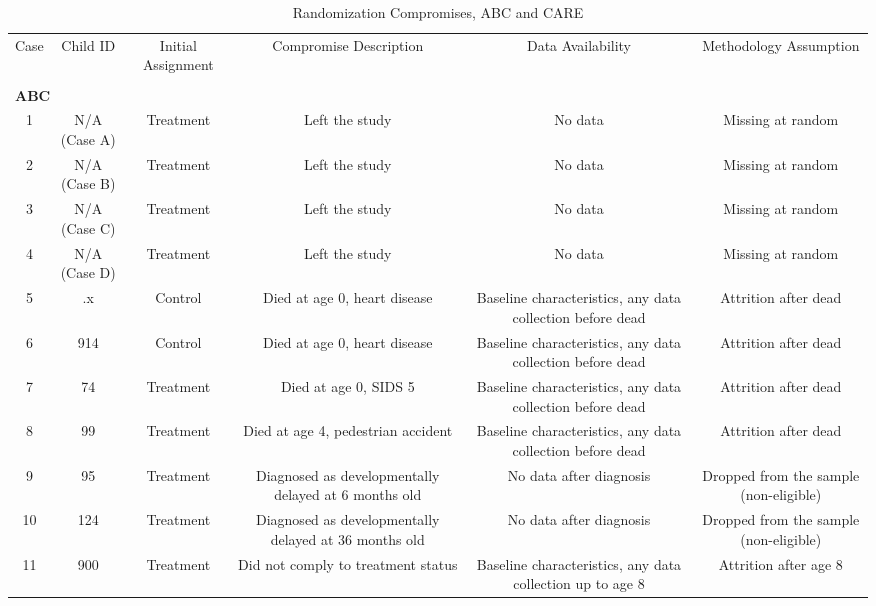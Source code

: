 

% 




\begin{sidewaystable}[H] 
\begin{threeparttable}
\caption{Randomization Compromises, ABC and CARE}
\label{table:yourlabel}
\centering
\tiny
\begin{tabular}{cccccc} \hline \hline
Case & Child ID & Initial Assignment & Compromise Description & Data Availability & Methodology Assumption \\ \\ \hline
\multicolumn{6}{l}{\textbf{ABC}} \\ 
1 & N/A (Case A) & Treatment & Left the study & No data & Missing at random \\
2 & N/A (Case B) & Treatment & Left the study & No data & Missing at random \\
3 & N/A (Case C) & Treatment & Left the study & No data & Missing at random \\
4 & N/A (Case D)          & Treatment & Left the study & No data & Missing at random \\
5 & .x & Control            & Died at age 0, heart disease & Baseline characteristics, any data collection before dead      & Attrition after dead \\
6 & 914 & Control         & Died at age 0, heart disease & Baseline characteristics, any data collection before dead   & Attrition after dead \\
7 & 74 & Treatment      & Died at age 0, SIDS  5 & Baseline characteristics, any data collection before dead & Attrition after dead \\
8 & 99 & Treatment      & Died at age 4, pedestrian accident & Baseline characteristics, any data collection before dead & Attrition after dead \\
9 & 95   & Treatment       & Diagnosed as developmentally delayed at 6 months old   & No data after diagnosis & Dropped from the sample (non-eligible) \\ 
10 & 124 & Treatment       & Diagnosed as developmentally delayed at 36 months old & No data after diagnosis & Dropped from the sample (non-eligible) \\ 
11   & 900 & Treatment  & Did not comply to treatment status  & Baseline characteristics, any data collection up to age 8 & Attrition after age 8  \\

\end{tabular}
\end{threeparttable}
\end{sidewaystable}
